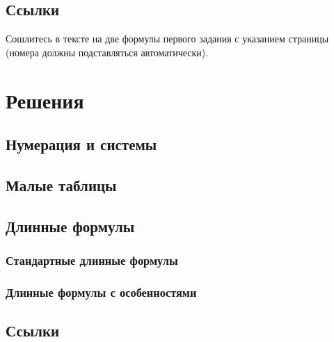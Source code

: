 \documentclass[a4paper,12pt]{article} %
\begin{document}
\subsection{Ссылки}

Сошлитесь в тексте на две формулы первого задания с указанием страницы (номера должны подставляться автоматически). 

\newpage

\section{Решения}

\subsection{Нумерация и системы}



\subsection{Малые таблицы}



\subsection{Длинные формулы}

\subsubsection{Стандартные длинные формулы}



\subsubsection{Длинные формулы с особенностями}



\subsection{Ссылки}
\end{document}
